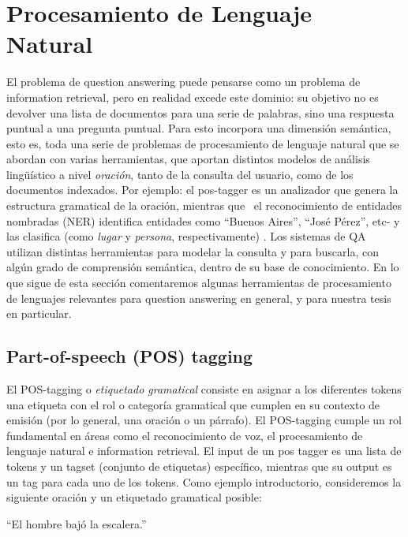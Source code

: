 \section{Procesamiento de Lenguaje Natural}
\label{sec:nlp}

El problema de question answering puede pensarse como un problema de information
retrieval, pero en realidad excede este dominio: su objetivo no es devolver una lista de documentos para
una serie de palabras, sino una respuesta puntual a una pregunta
puntual. Para esto incorpora una dimensión semántica, esto es, toda
una serie de problemas de procesamiento de lenguaje natural que se
abordan con varias herramientas, que aportan distintos modelos de
análisis lingüístico a nivel \textit{oración}, tanto de la
consulta del usuario, como de los documentos indexados. Por ejemplo: el
pos-tagger es un analizador que genera la estructura gramatical de la
oración, mientras que \ el reconocimiento de entidades nombradas
(NER) identifica entidades como {\textquotedblleft}Buenos
Aires{\textquotedblright}, {\textquotedblleft}José
Pérez{\textquotedblright}, etc- y las clasifica (como \textit{lugar}
y \textit{persona}, respectivamente) . Los sistemas de QA utilizan
distintas herramientas para modelar la consulta y para buscarla, con
algún grado de comprensión semántica, dentro de su base de
conocimiento.
En lo que sigue de esta sección comentaremos algunas herramientas de procesamiento de lenguajes relevantes para question answering en general, y para nuestra tesis en particular.

\subsection{Part-of-speech (POS) tagging}
\label{subsec:pos}

El POS-tagging o \textit{etiquetado gramatical} consiste en asignar a los diferentes 
tokens una etiqueta con el rol o categoría gramatical que cumplen en su contexto de emisión (por lo general, una oración o un párrafo). 
El POS-tagging cumple un rol fundamental en áreas como el reconocimiento de voz, el procesamiento de lenguaje natural e information retrieval.
El input de un pos tagger es una lista de tokens y un tagset (conjunto de etiquetas) específico, mientras que su output es un tag para cada uno 
de los tokens. Como ejemplo introductorio, consideremos la siguiente oración y un etiquetado gramatical posible:

\begin{center}
{\textquotedblleft}El hombre bajó la escalera.{\textquotedblright} 
\end{center}
\medskip


